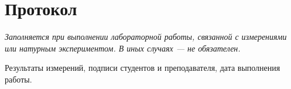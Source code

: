 \section*{Протокол}
\textit{Заполняется при выполнении лабораторной работы, связанной с измерениями или натурным экспериментом. В иных случаях — не обязателен.}

Результаты измерений, подписи студентов и преподавателя, дата выполнения работы.
